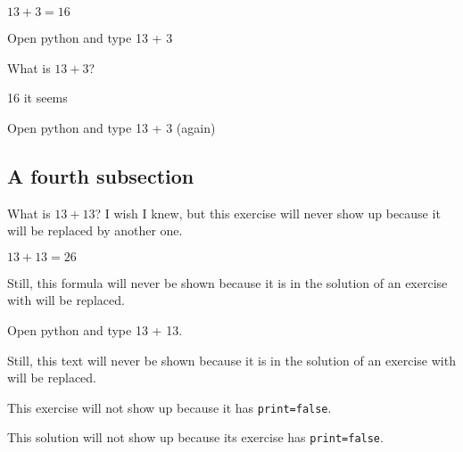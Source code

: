 \documentclass{book}
\begin{document}
\begin{solution}
  \(13 + 3 = 16\)
\end{solution}

\begin{additionalinformation}
Open python and type 13 + 3
\end{additionalinformation}

\begin{exercise}
  What is \(13 + 3\)?
\end{exercise}

\begin{solution}
16 it seems
\end{solution}

\begin{additionalinformation}
Open python and type 13 + 3 (again)
\end{additionalinformation}

\subsection{A fourth subsection}

\begin{exercise}[examdate={January 16, 2020}, examproblemnumber={1}, examproblemid={2020_01_16_01}]
  What is \(13 + 13\)? I wish I knew, but this exercise will never show up because it will be replaced by another one.
\end{exercise}

\begin{solution}
  \(13 + 13 = 26\)

Still, this formula will never be shown because it is in the solution of an exercise with will be replaced.
\end{solution}

\begin{additionalinformation}
Open python and type 13 + 13.

Still, this text will never be shown because it is in the solution of an exercise with will be replaced.
\end{additionalinformation}

\begin{exercise}[print=false]
This exercise will not show up because it has \texttt{print=false}.
\end{exercise}

\begin{solution}
This solution will not show up because its exercise has \texttt{print=false}.
\end{solution}
\end{document}
